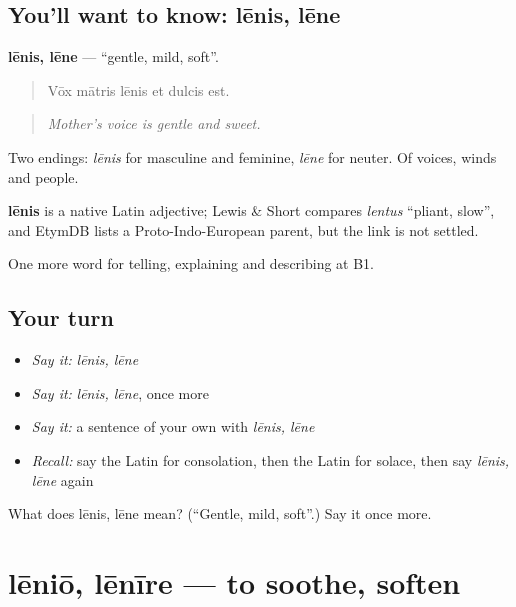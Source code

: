 \subsection*{You'll want to know: lēnis, lēne}
\textbf{lēnis, lēne} — \textquotedblleft{}gentle, mild, soft\textquotedblright{}.

\begin{quote}
Vōx mātris lēnis et dulcis est.
\end{quote}

\begin{quote}
\emph{Mother's voice is gentle and sweet.}
\end{quote}

Two endings: \emph{lēnis} for masculine and feminine, \emph{lēne} for neuter. Of voices, winds and people.

\begin{cousinweb}
\textbf{lēnis} is a native Latin adjective; Lewis \& Short compares \emph{lentus} \textquotedblleft{}pliant, slow\textquotedblright{}, and EtymDB lists a Proto-Indo-European parent, but the link is not settled.
\end{cousinweb}

\begin{grammarlens}[title={What you've built}]
One more word for telling, explaining and describing at B1.
\end{grammarlens}

\subsection*{Your turn}
\begin{itemize}
\raggedright
  \item \emph{Say it:} \emph{lēnis, lēne}
  \item \emph{Say it:} \emph{lēnis, lēne}, once more
  \item \emph{Say it:} a sentence of your own with \emph{lēnis, lēne}
  \item \emph{Recall:} say the Latin for consolation, then the Latin for solace, then say \emph{lēnis, lēne} again
\end{itemize}

\begin{tcolorbox}[breakable,colback=teal!4,colframe=teal!35!black,title={Before you move on}]
What does lēnis, lēne mean? (\textquotedblleft{}Gentle, mild, soft\textquotedblright{}.) Say it once more.
\end{tcolorbox}
\section[lēniō, lēnīre]{lēniō, lēnīre — to soothe, soften}

